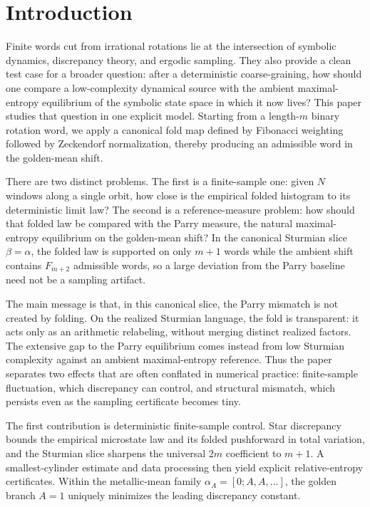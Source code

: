 \documentclass[11pt,letterpaper]{article}
\numberwithin{equation}{section}
\theoremstyle{plain}
\theoremstyle{definition}
\theoremstyle{remark}
\begin{document}
\section{Introduction}

Finite words cut from irrational rotations lie at the intersection of symbolic
dynamics, discrepancy theory, and ergodic sampling. They also provide a clean
test case for a broader question: after a deterministic coarse-graining, how
should one compare a low-complexity dynamical source with the ambient
maximal-entropy equilibrium of the symbolic state space in which it now lives?
This paper studies that question in one explicit model. Starting from a
length-$m$ binary rotation word, we apply a canonical fold map defined by
Fibonacci weighting followed by Zeckendorf normalization, thereby producing an
admissible word in the golden-mean shift.

There are two distinct problems. The first is a finite-sample one: given \(N\)
windows along a single orbit, how close is the empirical folded histogram to
its deterministic limit law? The second is a reference-measure problem: how
should that folded law be compared with the Parry measure, the natural
maximal-entropy equilibrium on the golden-mean shift? In the canonical
Sturmian slice \(\beta=\alpha\), the folded law is supported on only \(m+1\)
words while the ambient shift contains \(F_{m+2}\) admissible words, so a
large deviation from the Parry baseline need not be a sampling artifact.

The main message is that, in this canonical slice, the Parry mismatch is not
created by folding. On the realized Sturmian language, the fold is transparent:
it acts only as an arithmetic relabeling, without merging distinct realized
factors. The extensive gap to the Parry equilibrium comes instead from low
Sturmian complexity against an ambient maximal-entropy reference. Thus the
paper separates two effects that are often conflated in numerical practice:
finite-sample fluctuation, which discrepancy can control, and structural
mismatch, which persists even as the sampling certificate becomes tiny.

The first contribution is deterministic finite-sample control. Star discrepancy
bounds the empirical microstate law and its folded pushforward in total
variation, and the Sturmian slice sharpens the universal \(2m\) coefficient to
\(m+1\). A smallest-cylinder estimate and data processing then yield explicit
relative-entropy certificates. Within the metallic-mean family
\(\alpha_A=[0;A,A,\dots]\), the golden branch \(A=1\) uniquely minimizes the
leading discrepancy constant.
\end{document}
